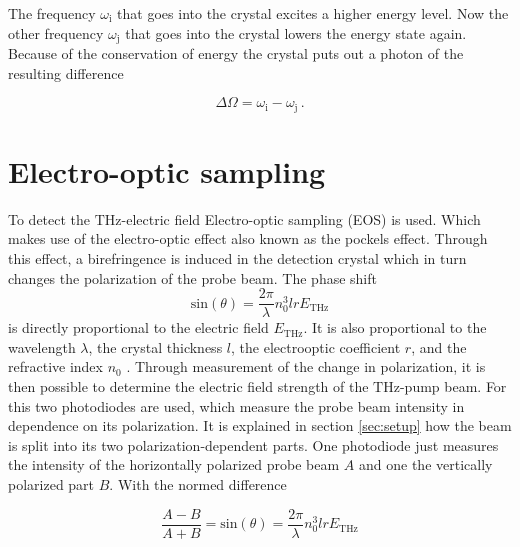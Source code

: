 The frequency $\omega_\text{i}$ that goes into the crystal excites a higher energy level.
Now the other frequency $\omega_\text{j}$ that goes into the crystal lowers the energy state again.
Because of the conservation of energy the crystal puts out a photon of the resulting difference

\begin{equation}
    \Delta\Omega = \omega_\text{i} - \omega_\text{j} \, .
\end{equation}





\section{Electro-optic sampling}\label{sec:eos}
To detect the $\si{\tera\hertz}$-electric field Electro-optic sampling (EOS) is used.
Which makes use of the electro-optic effect also known as the pockels effect.
Through this effect, a birefringence is induced in the detection crystal which in turn changes the polarization of the probe beam.
The phase shift 
\begin{equation}
    \text{sin}(\theta) = \frac{2\pi}{\lambda} n_0^3 l r E_\text{THz}
\end{equation}
is directly proportional to the electric field $E_\text{THz}$. 
It is also proportional to the wavelength $\lambda$, the crystal thickness $l$, the electrooptic coefficient $r$, and the refractive index $n_0$ \cite{wiki_book}. 
Through measurement of the change in polarization, it is then possible to determine the electric field strength of the $\si{\tera\hertz}$-pump beam.
For this two photodiodes are used, which measure the probe beam intensity in dependence on its polarization.
It is explained in section \ref{sec:setup} how the beam is split into its two polarization-dependent parts.
One photodiode just measures the intensity of the horizontally polarized probe beam $A$ and one the vertically polarized part $B$.
With the normed difference 

\begin{equation}
    \frac{A-B}{A+B} = \text{sin}(\theta) = \frac{2\pi}{\lambda} n_0^3 l r E_\text{THz}
    \label{eq:electricfield_A_B}
\end{equation}

